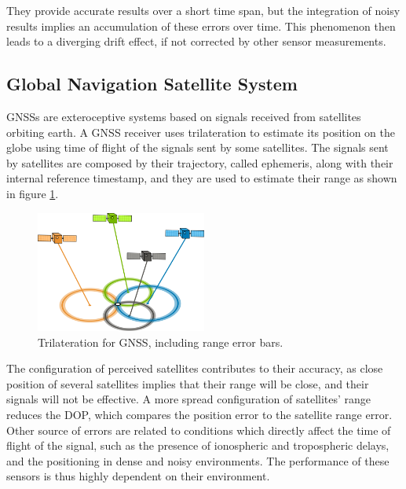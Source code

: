 They provide accurate results over a short time span, but the integration of noisy results implies an accumulation of these errors over time. This phenomenon then leads to a diverging drift effect, if not corrected by other sensor measurements.


\subsection{Global Navigation Satellite System}

\noindent \glspl{GNSS} are exteroceptive systems based on signals received from satellites orbiting earth.
A \gls{GNSS} receiver uses trilateration to estimate its position on the globe using time of flight of the signals sent by some satellites.
The signals sent by satellites are composed by their trajectory, called ephemeris, along with their internal reference timestamp, and they are used to estimate their range as shown in figure \ref{fig:gps}.
\begin{figure}[!ht]
  \begin{center}
    \includegraphics[width=0.5\textwidth]{Images/2-Background/GPS.png}
  \end{center}
  \caption{Trilateration for \Gls{GNSS}, including range error bars.}
  \label{fig:gps}
\end{figure}

The configuration of perceived satellites contributes to their accuracy, as close position of several satellites implies that their range will be close, and their signals will not be effective.
A more spread configuration of satellites' range reduces the \gls{DOP}, which compares the position error to the satellite range error.
Other source of errors are related to conditions which directly affect the time of flight of the signal, such as the presence of ionospheric and tropospheric delays, and the positioning in dense and noisy environments.
The performance of these sensors is thus highly dependent on their environment.

